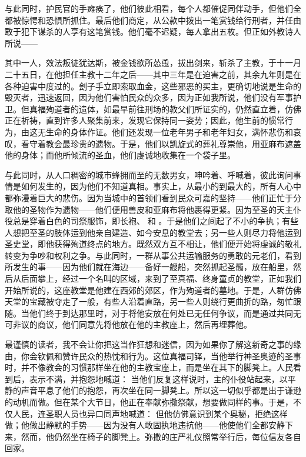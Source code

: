 与此同时，护民官的手瘫痪了，他们彼此相看，每个人都催促同伴动手，但他们全都被惊愕和恐惧所抓住。最后他们商定，从公款中拨出一笔赏钱给行刑者，并任由敢于犯下谋杀的人享有这笔赏钱。他们毫不迟疑，每人拿出五枚。但正如外教诗人所说——\par

 其中一人，效法叛徒犹达斯，被金钱欲所怂恿，拔出剑来，斩杀了主教，于十一月二十五日，在他担任主教十二年之后——其中三年是在迫害之前，其余九年则是在各种迫害中度过的。刽子手立即索取血金，这些邪恶的买主，更确切地说是生命的毁灭者，迅速返回，因为他们害怕民众的众多，因为正如我所说，他们没有军事护卫。但真福殉道者的遗体，如最早前往刑场的教父们所证实的，仍然直立着，仿佛正在祈祷，直到许多人聚集前来，发现它保持同一姿势；因此，他生前的惯常行为，由这无生命的身体作证。他们还发现一位老年男子和老年妇女，满怀悲伤和哀叹，看守着教会最珍贵的遗物。于是，他们以凯旋式的葬礼尊崇他，用亚麻布遮盖他的身体；而他所倾流的圣血，他们虔诚地收集在一个袋子里。\par

与此同时，从人口稠密的城市蜂拥而至的无数男女，呻吟着、呼喊着，彼此询问事情是如何发生的，因为他们不知道真相。事实上，从最小的到最大的，所有人心中都弥漫着巨大的悲伤。因为当城中的首领们看到民众可嘉的坚持——他们正忙于分取他的圣物作为遗物——他们便用兽皮和亚麻布将他裹得更紧。因为至圣的天主仆役总是穿着白色的司祭服饰，即长袍、 和 。于是他们之间起了不小的争执；有些人想把至圣的肢体运到他亲自建造、如今安息的教堂去；另一些人则尽力将他运到圣史堂，即他获得殉道终点的地方。既然双方互不相让，他们便开始将虔诚的敬礼转变为争吵和权利之争。与此同时，一群从事公共运输服务的勇敢的元老们，看到所发生的事——因为他们就在海边——备好一艘船，突然抓起圣髑，放在船里，然后从后面攀上，经过一个名叫的区域，来到了至真福、终身童贞的教堂，正如我们开始所说的，这座教堂是他建在西郊的郊区，作为殉道者的墓地。于是，人群仿佛天堂的宝藏被夺走了一般，有些人沿着直路，另一些人则绕行更曲折的路，匆忙跟随。当他们终于到达那里时，对于将他安放在何处已无任何争议，而是通过共同无可非议的商议，他们同意先将他放在他的主教座上，然后再埋葬他。\par

最谨慎的读者，我不会让你把这当作狂想和迷信，因为如果你了解这新奇之事的缘由，你会钦佩和赞许民众的热忱和行为。这位真福司铎，当他举行神圣奥迹的圣事时，并不像教会的习惯那样坐在他的主教宝座上，而是坐在其下的脚凳上。人民看到后，表示不满，并抱怨地喊道： 当他们反复这样说时，主的仆役站起来，以平静的声音平息了他们的抱怨，再次坐在同一脚凳上。所以这一切似乎都是出于谦逊的动机而做。但在某个大节日，他正在奉献弥撒祭献，想要做同样的事。于是，不仅人民，连圣职人员也异口同声地喊道： 但他仿佛意识到某个奥秘，拒绝这样做；他做出静默的手势——因为没有人敢固执地违抗他——他使他们全都安静下来，然而，他仍然坐在椅子的脚凳上。弥撒的庄严礼仪照常举行后，每位信友各自回家。\par

